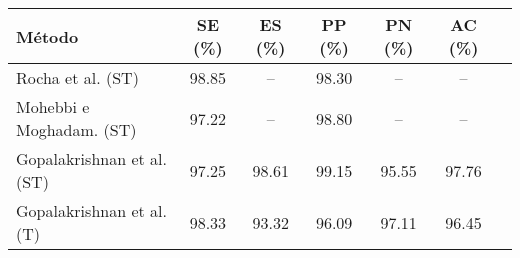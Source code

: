 \begin{tabular}{lcccccc}
    \toprule
    Método & SE (\%) & ES (\%) & PP (\%) & PN (\%) & AC (\%)\\
    \midrule
    Rocha et al. (ST)          & \cellcolor[gray]{0.9} 98.85 & --    & 98.30 & --    & --   \\
    Mohebbi e Moghadam. (ST)   & 97.22 & --    & 98.80 & --    & --   \\
    Gopalakrishnan et al. (ST) & 97.25 & 98.61 & \cellcolor[gray]{0.9} 99.15 & 95.55 & 97.76\\
    Gopalakrishnan et al. (T)  & 98.33 & 93.32 & 96.09 & 97.11 & 96.45\\
    \bottomrule
\end{tabular}
